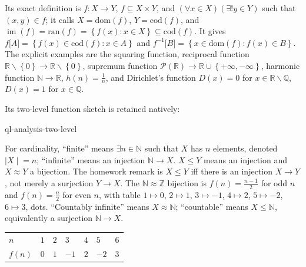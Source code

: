 Its exact definition is \(f:X\rightarrow Y\), \(f \subseteq X \times Y\), and \(\left( {\forall x \in X} \right)\left( {\exists!y \in Y} \right)\) such that \(\left( {x,y} \right) \in f\); it calls \(X = \text{dom}(f)\), \(Y = \text{cod}(f)\), and \(\operatorname{im}(f) = \text{ran}(f) = \left\{ {f(x):x \in X} \right\} \subseteq \text{cod}(f)\). It gives \(f\lbrack A\rbrack = \left\{ {f(x) \in \text{cod}(f):x \in A} \right\}\) and \(f^{- 1}\lbrack B\rbrack = \left\{ {x \in \text{dom}(f):f(x) \in B} \right\}\). The explicit examples are the squaring function, reciprocal function \(\mathbb{R} \smallsetminus \left\{ 0 \right\}\rightarrow\mathbb{R} \smallsetminus \left\{ 0 \right\}\), supremum function \(\mathcal{P}\left( \mathbb{R} \right)\rightarrow\mathbb{R} \cup \left\{ {+ \infty, - \infty} \right\}\), harmonic function \(\mathbb{N}\rightarrow\mathbb{R}\), \(h(n) = \frac{1}{n}\), and Dirichlet's function \(D(x) = 0\) for \(x \in \mathbb{R} \smallsetminus \mathbb{Q}\), \(D(x) = 1\) for \(x \in \mathbb{Q}\).

Its two-level function sketch is retained natively:

\begin{center}
\begin{qldrawing}
\csname ql-analysis-two-level\endcsname
\end{qldrawing}
\end{center}

For cardinality, ``finite'' means \(\exists n \in \mathbb{N}\) such that \(X\) has \(n\) elements, denoted \(\left. |X \middle| = n \right.\); ``infinite'' means an injection \(\mathbb{N}\rightarrow X\). \(X \leq Y\) means an injection and \(X \approx Y\) a bijection. The homework remark is \(X \leq Y\) iff there is an injection \(X\rightarrow Y\), not merely a surjection \(Y\rightarrow X\). The \(\mathbb{N} \approx \mathbb{Z}\) bijection is \(f(n) = \frac{n - 1}{2}\) for odd \(n\) and \(f(n) = \frac{n}{2}\) for even \(n\), with table \(1\mapsto 0\), \(2\mapsto 1\), \(3\mapsto - 1\), \(4\mapsto 2\), \(5\mapsto - 2\), \(6\mapsto 3\), dots. ``Countably infinite'' means \(X \approx \mathbb{N}\); ``countable'' means \(X \leq \mathbb{N}\), equivalently a surjection \(\mathbb{N}\rightarrow X\).

{\def\LTcaptype{none} %
\begin{longtable}[]{@{}lllllll@{}}
\toprule\noalign{}
\endhead
\bottomrule\noalign{}
\endlastfoot
\(n\) & \(1\) & \(2\) & \(3\) & \(4\) & \(5\) & \(6\) \\
\(f(n)\) & \(0\) & \(1\) & \(- 1\) & \(2\) & \(- 2\) & \(3\) \\
\end{longtable}
}

